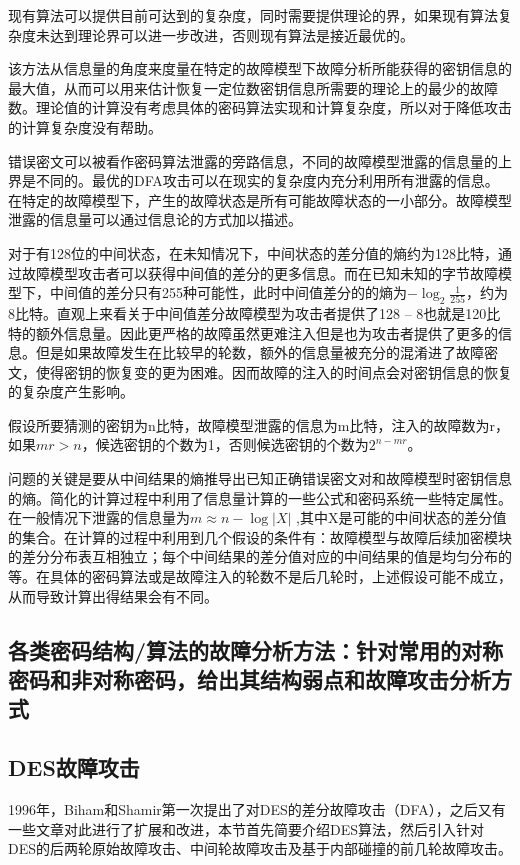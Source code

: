 \documentclass[a4paper,12pt]{article}
\begin{document}
\begin{CJK}{UTF8}{gkai}
现有算法可以提供目前可达到的复杂度，同时需要提供理论的界，如果现有算法复杂度未达到理论界可以进一步改进，否则现有算法是接近最优的。

该方法从信息量的角度来度量在特定的故障模型下故障分析所能获得的密钥信息的最大值，从而可以用来估计恢复一定位数密钥信息所需要的理论上的最少的故障数。理论值的计算没有考虑具体的密码算法实现和计算复杂度，所以对于降低攻击的计算复杂度没有帮助。

错误密文可以被看作密码算法泄露的旁路信息，不同的故障模型泄露的信息量的上界是不同的。最优的DFA攻击可以在现实的复杂度内充分利用所有泄露的信息。在特定的故障模型下，产生的故障状态是所有可能故障状态的一小部分。故障模型泄露的信息量可以通过信息论的方式加以描述。

对于有128位的中间状态，在未知情况下，中间状态的差分值的熵约为128比特，通过故障模型攻击者可以获得中间值的差分的更多信息。而在已知未知的字节故障模型下，中间值的差分只有255种可能性，此时中间值差分的的熵为$-\log_{2}\frac{1}{255}$⁡，约为8比特。直观上来看关于中间值差分故障模型为攻击者提供了128 – 8也就是120比特的额外信息量。因此更严格的故障虽然更难注入但是也为攻击者提供了更多的信息。但是如果故障发生在比较早的轮数，额外的信息量被充分的混淆进了故障密文，使得密钥的恢复变的更为困难。因而故障的注入的时间点会对密钥信息的恢复的复杂度产生影响。

假设所要猜测的密钥为n比特，故障模型泄露的信息为m比特，注入的故障数为r，如果$m r>n$，候选密钥的个数为1，否则候选密钥的个数为$2^{n-mr}$。

问题的关键是要从中间结果的熵推导出已知正确错误密文对和故障模型时密钥信息的熵。简化的计算过程中利用了信息量计算的一些公式和密码系统一些特定属性。在一般情况下泄露的信息量为$m\approx n-\log|X|$ ,其中X是可能的中间状态的差分值的集合。在计算的过程中利用到几个假设的条件有：故障模型与故障后续加密模块的差分分布表互相独立；每个中间结果的差分值对应的中间结果的值是均匀分布的等。在具体的密码算法或是故障注入的轮数不是后几轮时，上述假设可能不成立，从而导致计算出得结果会有不同。

\subsection{各类密码结构/算法的故障分析方法：针对常用的对称密码和非对称密码，给出其结构弱点和故障攻击分析方式}
\subsection{DES故障攻击}
1996年，Biham和Shamir第一次提出了对DES的差分故障攻击（DFA），之后又有一些文章对此进行了扩展和改进，本节首先简要介绍DES算法，然后引入针对DES的后两轮原始故障攻击、中间轮故障攻击及基于内部碰撞的前几轮故障攻击。

\end{CJK}
\end{document}
